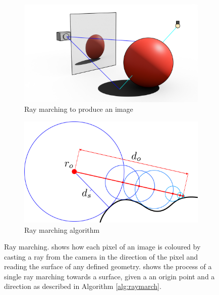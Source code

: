 \documentclass{l4proj}
\begin{document}
\begin{figure}[H]
  \centering
  \begin{subfigure}[b]{0.45\textwidth}
      \includegraphics[width=\textwidth]{images/raymarching/raymarch_ai.png}
      \caption{Ray marching to produce an image}
      \label{fig:rmcast}
  \end{subfigure}
  \begin{subfigure}[b]{0.45\textwidth}
      \includegraphics[width=\textwidth]{images/raymarching/algorithm_ai.png}
      \caption{Ray marching algorithm}
      \label{fig:rmalg}
  \end{subfigure}   
  \caption{Ray marching.  shows how each pixel of an image is coloured by casting a ray from the camera in the direction of the pixel and reading the surface of any defined geometry. 
   shows the process of a single ray marching towards a surface, given a an origin point and a direction as described in Algorithm \ref{alg:raymarch}.
  }\label{fig:raymarch}
\end{figure}
%
\end{document}

